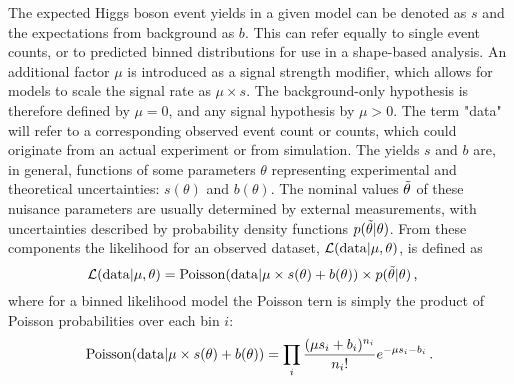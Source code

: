 The expected Higgs boson event yields in a given model can be denoted as $s$ and the expectations from background as $b$. This can refer equally to single event counts, or to predicted binned distributions for use in a shape-based analysis. An additional factor $\mu$ is introduced as a signal strength modifier, which allows for models to scale the signal rate as $\mu \times s$. The background-only hypothesis is therefore defined by $\mu = 0$, and any signal hypothesis by $\mu > 0$. The term "data" will refer to a corresponding observed event count or counts, which could originate from an actual experiment or from simulation. The yields $s$ and $b$ are, in general, functions of some parameters $\theta$ representing experimental and theoretical uncertainties: $s(\theta)$ and $b(\theta)$. The nominal values $\Tilde{\theta}$ of these nuisance parameters are usually determined by external measurements, with uncertainties described by probability density functions $p(\Tilde{\theta} | \theta)$. From these components the likelihood for an observed dataset, $\mathcal{L}(\mathrm{data}|\mu,\theta)$, is defined as
\begin{equation}
    \Lagr(\mathrm{data}|\mu,\theta) = \mathrm{Poisson}(\mathrm{data}|\mu\times s(\theta) + b(\theta)) \times p(\Tilde{\theta}|\theta) \msep
\end{equation}
where for a binned likelihood model the Poisson tern is simply the product of Poisson probabilities over each bin $i$:
\begin{equation}
    \mathrm{Poisson}(\mathrm{data}|\mu\times s(\theta) + b(\theta)) = \prod_{i} \frac{(\mu s_i + b_i)^{n_i}}{n_i !} e^{-\mu s_i -b_i} \mend
\end{equation}

